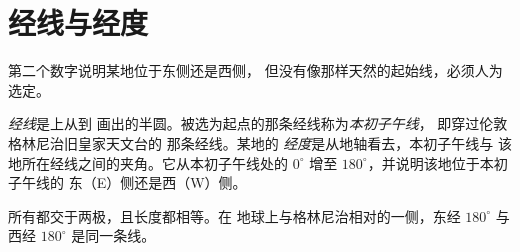 \section{经线与经度}

第二个数字说明某地位于东侧还是西侧，
但没有像那样天然的起始线，必须人为选定。

\begin{definition}[经线、经度与本初子午线]\label{def:g6:latitude-longitude:longitude}
\emph{经线}是上从到
画出的半圆。被选为起点的那条经线称为\emph{本初子午线}，
即穿过伦敦格林尼治旧皇家天文台的
那条经线。某地的
\emph{经度}是从地轴看去，本初子午线与
该地所在经线之间的夹角。它从本初子午线处的 $0^\circ$
增至 $180^\circ$，并说明该地位于本初子午线的
东（E）侧还是西（W）侧。
\end{definition}

所有都交于两极，且长度都相等。在
地球上与格林尼治相对的一侧，东经 $180^\circ$ 与
西经 $180^\circ$ 是同一条线。

